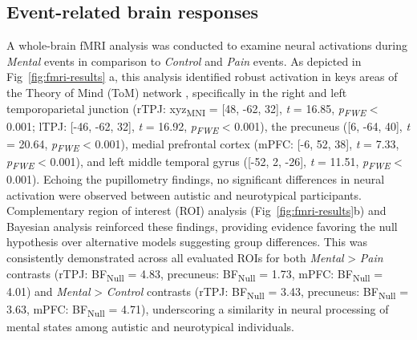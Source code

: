 \subsection*{Event-related brain responses}
A whole-brain fMRI analysis was conducted to examine neural activations during \textit{Mental} events in comparison to \textit{Control} and \textit{Pain} events. As depicted in Fig~\ref{fig:fmri-results} a, this analysis identified robust activation in keys areas of the Theory of Mind (ToM) network \citep{schurz2014}, specifically in the right and left temporoparietal junction (rTPJ: xyz\textsubscript{MNI} = [48, -62, 32], \textit{t} = 16.85, \textit{p\textsubscript{FWE}} < 0.001; lTPJ: [-46, -62, 32], \textit{t} = 16.92, \textit{p\textsubscript{FWE}} < 0.001), the precuneus ([6, -64, 40], \textit{t} = 20.64, \textit{p\textsubscript{FWE}} < 0.001), medial prefrontal cortex (mPFC: [-6, 52, 38], \textit{t} = 7.33, \textit{p\textsubscript{FWE}} < 0.001), and left middle temporal gyrus ([-52, 2, -26], \textit{t} = 11.51, \textit{p\textsubscript{FWE}} < 0.001). Echoing the pupillometry findings, no significant differences in neural activation were observed between autistic and neurotypical participants. Complementary region of interest (ROI) analysis (Fig~\ref{fig:fmri-results}b) and Bayesian analysis reinforced these findings, providing evidence favoring the null hypothesis over alternative models suggesting group differences. This was consistently demonstrated across all evaluated ROIs for both \textit{Mental} > \textit{Pain} contrasts (rTPJ: BF\textsubscript{Null} = 4.83, precuneus: BF\textsubscript{Null} = 1.73, mPFC: BF\textsubscript{Null} = 4.01) and \textit{Mental} > \textit{Control} contrasts (rTPJ: BF\textsubscript{Null} = 3.43, precuneus: BF\textsubscript{Null} = 3.63,  mPFC: BF\textsubscript{Null} = 4.71), underscoring a similarity in neural processing of mental states among autistic and neurotypical individuals.



